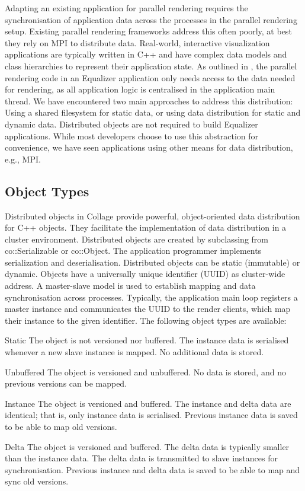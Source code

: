 Adapting an existing application for parallel rendering requires the
synchronisation of application data across the processes in the parallel
rendering setup. Existing parallel rendering frameworks address this often
poorly, at best they rely on MPI to distribute data. Real-world, interactive
visualization applications are typically written in C++ and have complex data
models and class hierarchies to represent their application state. As outlined
in \cite{EMP:09}, the parallel rendering code in an \textsf{Equalizer}
application only needs access to the data needed for rendering, as all
application logic is centralised in the application main thread. We have
encountered two main approaches to address this distribution: Using a shared
filesystem for static data, or using data distribution for static and dynamic
data. Distributed objects are not required to build \textsf{Equalizer}
applications. While most developers choose to use this abstraction for
convenience, we have seen applications using other means for data distribution,
e.g., MPI.

\subsection{Object Types}

Distributed objects in \textsf{Collage} provide powerful, object-oriented data
distribution for C++ objects. They facilitate the implementation of data
distribution in a cluster environment. Distributed objects are created by
subclassing from \textsf{co::Serializable} or \textsf{co::Object}. The
application programmer implements serialization and deserialisation. Distributed
objects can be static (immutable) or dynamic. Objects have a universally unique
identifier (UUID) as cluster-wide address. A master-slave model is used to
establish mapping and data synchronisation across processes. Typically, the
application main loop registers a master instance and communicates the UUID to
the render clients, which map their instance to the given identifier. The
following object types are available:

\begin{compactdesc}
\item[Static] The object is not versioned nor buffered. The instance data is
  serialised whenever a new slave instance is mapped. No additional data is
  stored.
\item[Unbuffered] The object is versioned and unbuffered. No data is stored, and
  no previous versions can be mapped.
\item[Instance] The object is versioned and buffered. The instance and delta
  data are identical; that is, only instance data is serialised. Previous
  instance data is saved to be able to map old versions.
\item[Delta] The object is versioned and buffered. The delta data is typically
  smaller than the instance data. The delta data is transmitted to slave
  instances for synchronisation. Previous instance and delta data is saved to be
  able to map and sync old versions.
\end{compactdesc}

